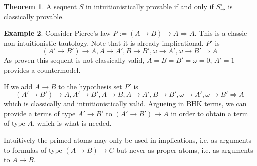 \documentclass[a4paper,12pt]{article}
\theoremstyle{definition}
\newtheorem{theorem}{Theorem}[section]
\theoremstyle{definition}
\theoremstyle{definition}
\theoremstyle{definition}
\theoremstyle{definition}
\theoremstyle{definition}
\newtheorem{example}[theorem]{Example}
\begin{document}
	\begin{theorem}
		A sequent $S$ in intuitionistically provable if and only if $S^\circ_\to$ is classically provable.
	\end{theorem}

	\begin{example}
		Consider Pierce's law $P := (A\to B)\to A\Rightarrow A$. This is a classic non-intuitionistic tautology. Note that it is already implicational. $P'$ is $$(A'\to B')\to A, A\to A', B\to B', \omega\to A', \omega\to B'\Rightarrow A$$ As proven this sequent is not classically valid, $A = B = B' = \omega = 0$, $A' = 1$  provides a countermodel.
		
		If we add $A\to B$ to the hypothesis set $P'$ is $$(A'\to B')\to A, A'\to B', A\to B, A\to A', B\to B', \omega\to A', \omega\to B'\Rightarrow A$$ which is classically and intuitionistically valid. Argueing in BHK terms, we can provide a terms of type $A'\to B'$ to $(A'\to B')\to A$ in order to obtain a term of type $A$, which is what is needed.
	\end{example}

	Intuitively the primed atoms may only be used in implications, i.e. as arguments to formulas of type $(A\to B)\to C$ but never as proper atoms, i.e. as arguments to $A\to B$.
	
	
	
	
\end{document}
